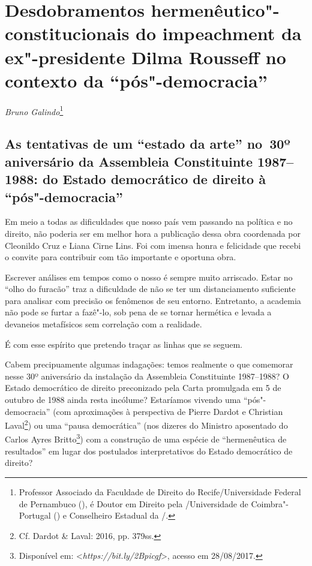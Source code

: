 \chapter*{Desdobramentos hermenêutico"-constitucionais do
impeachment da ex"-presidente Dilma Rousseff no contexto da
``pós"-democracia''}


\begin{flushright}
\emph{Bruno Galindo}\footnote{Professor Associado da Faculdade de Direito do Recife/Universidade
Federal de Pernambuco (), é
Doutor em Direito pela /Universidade de Coimbra"-Portugal
() e Conselheiro Estadual da /.}
\end{flushright}


 \section{As tentativas de um ``estado da arte'' no~30º aniversário da
  Assembleia Constituinte 1987--1988: do Estado democrático de direito à
  ``pós"-democracia''}


Em meio a todas as dificuldades que nosso país vem passando na política
e no direito, não poderia ser em melhor hora a publicação dessa obra
coordenada por Cleonildo Cruz e Liana Cirne Lins. Foi com imensa honra e
felicidade que recebi o convite para contribuir com tão importante e
oportuna obra.

Escrever análises em tempos como o nosso é sempre muito arriscado. Estar
no ``olho do furacão'' traz a dificuldade de não se ter um
distanciamento suficiente para analisar com precisão os fenômenos de seu
entorno. Entretanto, a academia não pode se furtar a fazê"-lo, sob pena
de se tornar hermética e levada a devaneios metafísicos sem correlação
com a realidade.

É com esse espírito que pretendo traçar as linhas que se seguem.

Cabem precipuamente algumas indagações: temos realmente o que comemorar
nesse 30º aniversário da instalação da Assembleia Constituinte
1987--1988? O Estado democrático de direito preconizado pela Carta
promulgada em 5 de outubro de 1988 ainda resta incólume? Estaríamos
vivendo uma ``pós"-democracia'' (com aproximações à perspectiva de Pierre
Dardot e Christian Laval\footnote{Cf. Dardot \& Laval: 2016, pp. 379ss.}) ou
uma ``pausa democrática'' (nos dizeres do Ministro aposentado do 
Carlos Ayres Britto\footnote{Disponível em: \textless{}\emph{https://bit.ly/2Bpicgf}\textgreater{},
  acesso em 28/08/2017.}) com a construção de uma espécie de
``hermenêutica de resultados'' em lugar dos postulados interpretativos
do Estado democrático de direito?

